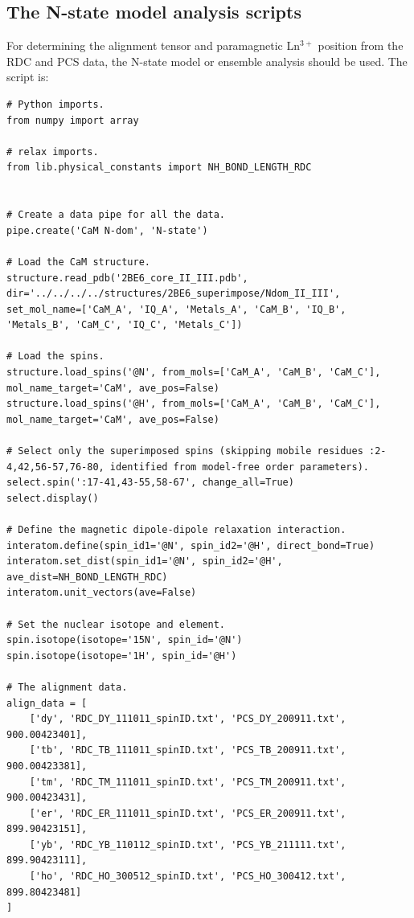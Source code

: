 \subsection{The N-state model analysis scripts}
\label{sect: N-state model analysis scripts}

For determining the alignment tensor and paramagnetic Ln$^{3+}$ position from the RDC and PCS data, the N-state model or ensemble analysis should be used.
The script is:

\begin{lstlisting}
# Python imports.
from numpy import array

# relax imports.
from lib.physical_constants import NH_BOND_LENGTH_RDC


# Create a data pipe for all the data.
pipe.create('CaM N-dom', 'N-state')

# Load the CaM structure.
structure.read_pdb('2BE6_core_II_III.pdb', dir='../../../../structures/2BE6_superimpose/Ndom_II_III', set_mol_name=['CaM_A', 'IQ_A', 'Metals_A', 'CaM_B', 'IQ_B', 'Metals_B', 'CaM_C', 'IQ_C', 'Metals_C'])

# Load the spins.
structure.load_spins('@N', from_mols=['CaM_A', 'CaM_B', 'CaM_C'], mol_name_target='CaM', ave_pos=False)
structure.load_spins('@H', from_mols=['CaM_A', 'CaM_B', 'CaM_C'], mol_name_target='CaM', ave_pos=False)

# Select only the superimposed spins (skipping mobile residues :2-4,42,56-57,76-80, identified from model-free order parameters).
select.spin(':17-41,43-55,58-67', change_all=True)
select.display()

# Define the magnetic dipole-dipole relaxation interaction.
interatom.define(spin_id1='@N', spin_id2='@H', direct_bond=True)
interatom.set_dist(spin_id1='@N', spin_id2='@H', ave_dist=NH_BOND_LENGTH_RDC)
interatom.unit_vectors(ave=False)

# Set the nuclear isotope and element.
spin.isotope(isotope='15N', spin_id='@N')
spin.isotope(isotope='1H', spin_id='@H')

# The alignment data.
align_data = [
    ['dy', 'RDC_DY_111011_spinID.txt', 'PCS_DY_200911.txt', 900.00423401],
    ['tb', 'RDC_TB_111011_spinID.txt', 'PCS_TB_200911.txt', 900.00423381],
    ['tm', 'RDC_TM_111011_spinID.txt', 'PCS_TM_200911.txt', 900.00423431],
    ['er', 'RDC_ER_111011_spinID.txt', 'PCS_ER_200911.txt', 899.90423151],
    ['yb', 'RDC_YB_110112_spinID.txt', 'PCS_YB_211111.txt', 899.90423111],
    ['ho', 'RDC_HO_300512_spinID.txt', 'PCS_HO_300412.txt', 899.80423481]
]


\end{lstlisting}
